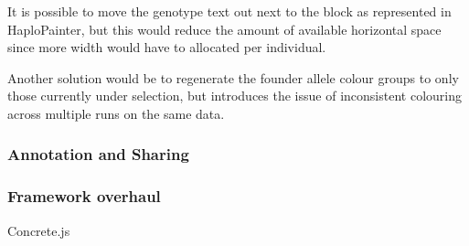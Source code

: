 It is possible to move the genotype text out next to the block as represented in HaploPainter, but this would reduce the amount of available horizontal space since more width would have to allocated per individual.

Another solution would be to regenerate the founder allele colour groups to only those currently under selection, but introduces the issue of inconsistent colouring across multiple runs on the same data.


\subsubsection{Annotation and Sharing}


\subsubsection{Framework overhaul}
Concrete.js \cite{concretejs}



